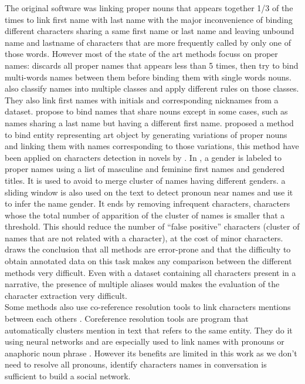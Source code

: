 \documentclass[a4paper, 12pt]{report}
\begin{document}
The original software \citep{original} was linking proper nouns that appears together 1/3 of the times to link first name with last name with the major inconvenience of binding different characters sharing a same first name or last name and leaving unbound name and lastname of characters that are more frequently called by only one of those words. 
However most of the state of the art methods focuss on proper names: 
\cite{delete5} discards all proper names that appears less than 5 times, then try to bind multi-words names between them before binding them with single words nouns. 
\cite{structure_clustering} also classify names into multiple classes and apply different rules on those classes. 
They also link first names with initials and corresponding nicknames from a dataset. 
\cite{character_meta} propose to bind names that share nouns except in some cases, such as names sharing a last name but having a different first name. 
\cite{variation} proposed a method to bind entity representing art object by generating variations of proper nouns and linking them with names corresponding to those variations, 
this method have been applied on characters detection in novels by \cite{quoted, character_meta}.  
In \cite{delete5, structure_clustering, quoted},  a gender is labeled to proper names using a list of masculine and feminine first names and gendered titles. 
It is used to avoid to merge cluster of names having different genders. 
\cite{ structure_clustering} a sliding window is also used on the text to detect pronoun near names and use it to infer the name gender. 
It ends by removing infrequent characters, characters whose the total number of apparition of the cluster of names  is smaller that a threshold. 
This should reduce the number of ``false positive'' characters (cluster of names that are not related with a character), at the cost of minor characters. 
\cite{delete5} draws the conclusion that all methods are error-prone and that the difficulty to obtain annotated data on this task makes any comparison 
between the different methods very difficult. 
Even with a dataset containing all characters present in a narrative, the presence of multiple aliases would makes the evaluation of the character extraction very difficult.\\

Some methods also use co-reference resolution tools to link characters mentions between each others \citep{character_meta}.
Coreference resolution tools are program that automatically clusters mention in text that refers to the same entity. 
They do it using neural networks and are especially used to link names with pronouns or anaphoric noun phrase \citep{coref_deep, coref_deep2}. 
However its benefits are limited in this work as we don't need to resolve all pronouns, identify characters names in conversation is sufficient to build a social network.\\
\end{document}

